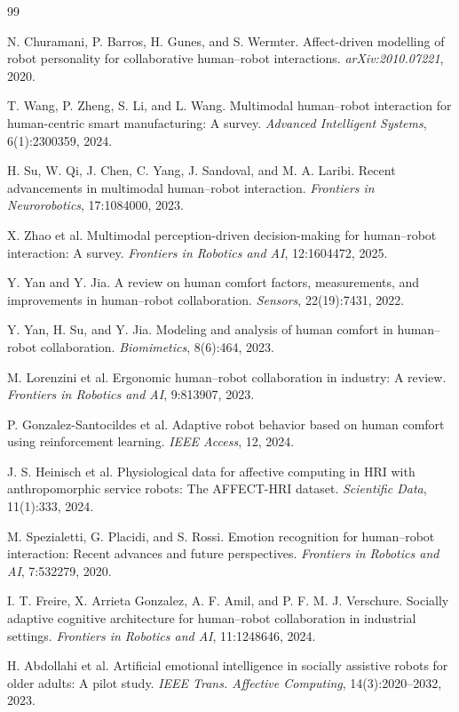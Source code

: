\documentclass{article}
\begin{document}
\begin{thebibliography}{99}

 N. Churamani, P. Barros, H. Gunes, and S. Wermter. Affect-driven modelling of robot personality for collaborative human--robot interactions. \emph{arXiv:2010.07221}, 2020.

 T. Wang, P. Zheng, S. Li, and L. Wang. Multimodal human--robot interaction for human-centric smart manufacturing: A survey. \emph{Advanced Intelligent Systems}, 6(1):2300359, 2024.

 H. Su, W. Qi, J. Chen, C. Yang, J. Sandoval, and M. A. Laribi. Recent advancements in multimodal human--robot interaction. \emph{Frontiers in Neurorobotics}, 17:1084000, 2023.

 X. Zhao et al. Multimodal perception-driven decision-making for human--robot interaction: A survey. \emph{Frontiers in Robotics and AI}, 12:1604472, 2025.

 Y. Yan and Y. Jia. A review on human comfort factors, measurements, and improvements in human--robot collaboration. \emph{Sensors}, 22(19):7431, 2022.

 Y. Yan, H. Su, and Y. Jia. Modeling and analysis of human comfort in human--robot collaboration. \emph{Biomimetics}, 8(6):464, 2023.

 M. Lorenzini et al. Ergonomic human--robot collaboration in industry: A review. \emph{Frontiers in Robotics and AI}, 9:813907, 2023.

 P. Gonzalez-Santocildes et al. Adaptive robot behavior based on human comfort using reinforcement learning. \emph{IEEE Access}, 12, 2024.

 J. S. Heinisch et al. Physiological data for affective computing in HRI with anthropomorphic service robots: The AFFECT-HRI dataset. \emph{Scientific Data}, 11(1):333, 2024.

 M. Spezialetti, G. Placidi, and S. Rossi. Emotion recognition for human--robot interaction: Recent advances and future perspectives. \emph{Frontiers in Robotics and AI}, 7:532279, 2020.

 I. T. Freire, X. Arrieta Gonzalez, A. F. Amil, and P. F. M. J. Verschure. Socially adaptive cognitive architecture for human--robot collaboration in industrial settings. \emph{Frontiers in Robotics and AI}, 11:1248646, 2024.

 H. Abdollahi et al. Artificial emotional intelligence in socially assistive robots for older adults: A pilot study. \emph{IEEE Trans. Affective Computing}, 14(3):2020--2032, 2023.


\end{thebibliography}
\end{document}
